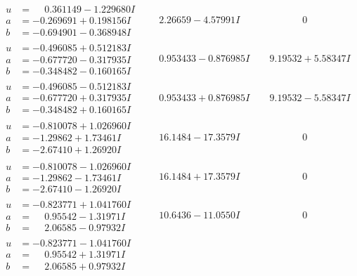 \documentclass[1p]{elsarticle_modified}
\theoremstyle{definition}
\begin{document}
$$\begin{array}{c|c|c}
 \hline 
\begin{aligned}
u &= \phantom{-}0.361149 - 1.229680 I \\
a &= -0.269691 + 0.198156 I \\
b &= -0.694901 - 0.368948 I\end{aligned}
 & \phantom{-}2.26659 - 4.57991 I & \phantom{-0.000000 } 0 \\ \hline\begin{aligned}
u &= -0.496085 + 0.512183 I \\
a &= -0.677720 - 0.317935 I \\
b &= -0.348482 - 0.160165 I\end{aligned}
 & \phantom{-}0.953433 - 0.876985 I & \phantom{-}9.19532 + 5.58347 I \\ \hline\begin{aligned}
u &= -0.496085 - 0.512183 I \\
a &= -0.677720 + 0.317935 I \\
b &= -0.348482 + 0.160165 I\end{aligned}
 & \phantom{-}0.953433 + 0.876985 I & \phantom{-}9.19532 - 5.58347 I \\ \hline\begin{aligned}
u &= -0.810078 + 1.026960 I \\
a &= -1.29862 + 1.73461 I \\
b &= -2.67410 + 1.26920 I\end{aligned}
 & \phantom{-}16.1484 - 17.3579 I & \phantom{-0.000000 } 0 \\ \hline\begin{aligned}
u &= -0.810078 - 1.026960 I \\
a &= -1.29862 - 1.73461 I \\
b &= -2.67410 - 1.26920 I\end{aligned}
 & \phantom{-}16.1484 + 17.3579 I & \phantom{-0.000000 } 0 \\ \hline\begin{aligned}
u &= -0.823771 + 1.041760 I \\
a &= \phantom{-}0.95542 - 1.31971 I \\
b &= \phantom{-}2.06585 - 0.97932 I\end{aligned}
 & \phantom{-}10.6436 - 11.0550 I & \phantom{-0.000000 } 0 \\ \hline\begin{aligned}
u &= -0.823771 - 1.041760 I \\
a &= \phantom{-}0.95542 + 1.31971 I \\
b &= \phantom{-}2.06585 + 0.97932 I\end{aligned}

\end{array}$$
\end{document}
